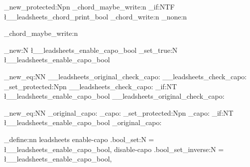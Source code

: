 \ExplSyntaxOn
\cs_new_protected:Npn \leadsheets_chord_maybe_write:n
{
  \bool_if:NTF \l__leadsheets_chord_print_bool
  {
    \leadsheets_chord_write:n
  }
  {
    \use_none:n
  } 
}

\RenewDocumentCommand \writechord {}
{\leadsheets_chord_maybe_write:n }


\bool_new:N \l__leadsheets_enable_capo_bool
\bool_set_true:N \l__leadsheets_enable_capo_bool

\cs_new_eq:NN \__leadsheets_original_check_capo:  \__leadsheets_check_capo:
\cs_set_protected:Npn \__leadsheets_check_capo:
{
  \bool_if:NT \l__leadsheets_enable_capo_bool
  {
    \__leadsheets_original_check_capo:
  }
}

\cs_new_eq:NN \leadsheets_original_capo: \leadsheets_capo:
\cs_set_protected:Npn \leadsheets_capo:
{
  \bool_if:NT \l__leadsheets_enable_capo_bool
  {
    \leadsheets_original_capo:
  }
}

\keys_define:nn {leadsheets}
{
  enable-capo .bool_set:N = \l__leadsheets_enable_capo_bool,
  disable-capo .bool_set_inverse:N = \l__leadsheets_enable_capo_bool,
}

\ExplSyntaxOff


